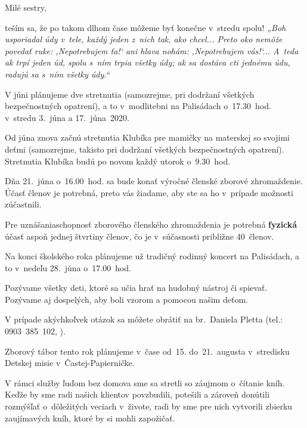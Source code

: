 

Milé sestry,

teším sa, že po takom dlhom čase môžeme byť konečne v~stredu spolu! {\it „Boh usporiadal údy v~tele, každý jeden z~nich tak, ako chcel... Preto oko nemôže povedať ruke: ‚Nepotrebujem ťa!‘ ani hlava nohám: ‚Nepotrebujem vás!‘... A~teda ak trpí jeden úd, spolu s~ním trpia všetky údy; ak sa dostáva cti jednému údu, radujú sa s~ním všetky údy.“}

V júni plánujeme dve stretnutia (samozrejme, pri dodržaní všetkých bezpečnostných opatrení), a to v~modlitebni na Palisádach o~17.30~hod. v~stredu 3.~júna a 17.~júna~2020.



Od júna znova začnú stretnutia Klubíka pre mamičky na materskej so svojimi deťmi (samozrejme, takisto pri dodržaní všetkých bezpečnostných opatrení). Stretnutia Klubíka budú po novom každý utorok o~9.30~hod.

\vfill\break


Dňa 21.~júna o~16.00~hod. sa bude konať výročné členské zborové zhromaždenie. Účasť členov je potrebná, preto vás žiadame, aby ste sa ho v~prípade možnosti zúčastnili.

Pre uznášaniaschopnosť zborového členského zhromaždenia je potrebná {\bf fyzická} účasť aspoň jednej štvrtiny členov, čo je v~súčasnosti približne 40~členov.


Na konci školského roka plánujeme už tradičný rodinný koncert na Palisádach, a to v~nedeľu 28.~júna o~17.00~hod.

Pozývame všetky deti, ktoré sa učia hrať na hudobný nástroj či spievať. Pozývame aj dospelých, aby boli vzorom a pomocou našim deťom.

V prípade akýchkoľvek otázok sa môžete obrátiť na br.~Daniela Pletta (tel.: 0903~385~102, ).


Zborový tábor tento rok plánujeme v~čase od~15. do~21.~augusta v~stredisku Detskej misie v~Častej-Papierničke.
\vfill\break


V rámci služby ľuďom bez domova sme sa stretli so záujmom o~čítanie kníh. Keďže by sme radi našich klientov povzbudili, potešili a zároveň donútili rozmýšľať o~dôležitých veciach v~živote, radi by sme pre nich vytvorili zbierku zaujímavých kníh, ktoré by si mohli zapožičať.

